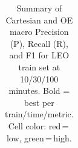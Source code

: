 \begin{table}[t]
{\begin{tabular}{l ccc ccc ccc ccc ccc ccc}
\bottomrule
\end{tabular}%
}
\caption{Summary of Cartesian and OE macro Precision (P), Recall (R), and F1 for LEO train set at 10/30/100 minutes. Bold = best per train/time/metric. Cell color: red\,=\,low, green\,=\,high.}
\label{tab:class_leo_feat}
\end{table}
